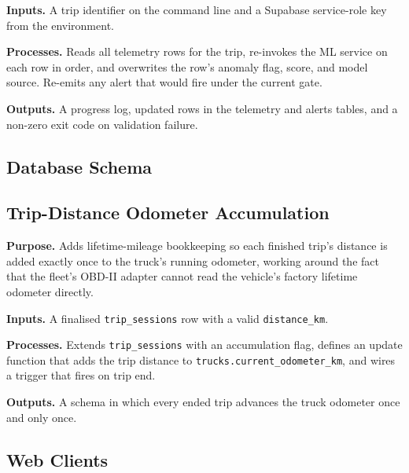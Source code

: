 \noindent\textbf{Inputs.} A trip identifier on the command line and a Supabase service-role key from the environment.

\noindent\textbf{Processes.} Reads all telemetry rows for the trip, re-invokes the ML service on each row in order, and overwrites the row's anomaly flag, score, and model source. Re-emits any alert that would fire under the current gate.

\noindent\textbf{Outputs.} A progress log, updated rows in the telemetry and alerts tables, and a non-zero exit code on validation failure.



\subsection*{Database Schema}

\subsection{Trip-Distance Odometer Accumulation}
\label{sec:code_sql_odometer_accum}

\noindent\textbf{Purpose.} Adds lifetime-mileage bookkeeping so each finished trip's distance is added exactly once to the truck's running odometer, working around the fact that the fleet's OBD-II adapter cannot read the vehicle's factory lifetime odometer directly.

\noindent\textbf{Inputs.} A finalised \texttt{trip\_sessions} row with a valid \texttt{distance\_km}.

\noindent\textbf{Processes.} Extends \texttt{trip\_sessions} with an accumulation flag, defines an update function that adds the trip distance to \texttt{trucks.current\_odometer\_km}, and wires a trigger that fires on trip end.

\noindent\textbf{Outputs.} A schema in which every ended trip advances the truck odometer once and only once.



\subsection*{Web Clients}

